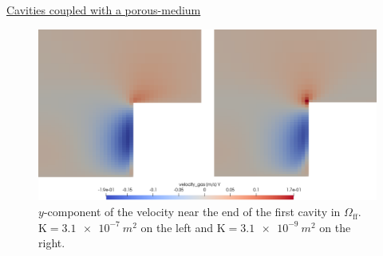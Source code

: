 \documentclass{beamer}
\begin{document}
\begin{frame}[label=coupledSupp]{\hyperlink{coupled}{Cavities coupled with a 
porous-medium}}
\begin{figure}
\centering
\includegraphics[width=\textwidth]{coupled_split_comparison.png}
\vspace{0.1cm}
\caption{\footnotesize $y$-component of the velocity near the end 
of 
the first 
cavity in $\Omega_\text{ff}$. $\mathrm{K}=\SI{3.1e-7}{m^2}$ on the left and 
$\mathrm{K}=\SI{3.1e-9}{m^2}$ on the right.}
\end{figure}
\end{frame}
\end{document}
